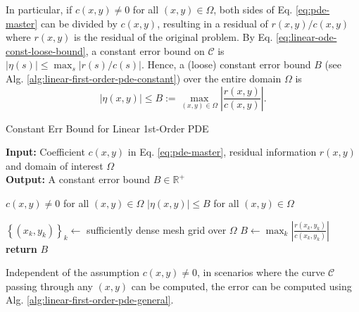 \documentclass[accepted]{uai2023}
\newcommand{\Err}{\eta}
\begin{document}
    In particular, if $c(x, y) \neq 0$ for all $(x, y) \in \Omega$, both sides of Eq. \ref{eq:pde-master} can be divided by $c(x, y)$, resulting in a residual of $r(x, y)/c(x, y)$ where $r(x, y)$ is the residual of the original problem. 
    By Eq. \ref{eq:linear-ode-const-loose-bound}, a constant error bound on $\mathcal{C}$ is $|\Err(s)| \leq \max_{s}\left|r(s)/c(s)\right|$. 
    Hence, a (loose) constant error bound $B$ (see Alg. \ref{alg:linear-first-order-pde-constant}) over the entire domain $\Omega$ is
    {
        \small
        \begin{equation}
            |\Err(x, y)| \leq B :=\max_{(x, y)\in \Omega}\left|\frac{r(x, y)}{c(x, y)}\right|.
        \end{equation}
    }

    \begin{algorithm}
        \small
        \caption{Constant Err Bound for Linear 1st-Order PDE}\label{alg:linear-first-order-pde-constant}
        \textbf{Input:} Coefficient $c(x, y)$ in Eq. \ref{eq:pde-master}, residual information $r(x, y)$ and domain of interest $\Omega$\\
        \textbf{Output:} A constant error bound $B \in \mathbb{R}^+$
        \begin{algorithmic}
            \Require $c(x, y) \neq 0$ for all $(x, y) \in \Omega$
            \Ensure $|\Err(x, y)| \leq B$ for all $(x, y) \in \Omega$

            \State $\left\{(x_k, y_k)\right\}_{k} \gets$ sufficiently dense mesh grid over $\Omega$
            \State $\displaystyle B \gets \max_{k} \left| \frac{r(x_k, y_k)}{c(x_k, y_k)}\right|$
            \State \textbf{return} $B$
        \end{algorithmic}
    \end{algorithm}

    Independent of the assumption $c(x, y)\neq 0$, in scenarios where the curve $\mathcal{C}$ passing through any $(x, y)$ can be computed, the error can be computed using Alg. \ref{alg:linear-first-order-pde-general}.
\end{document}
